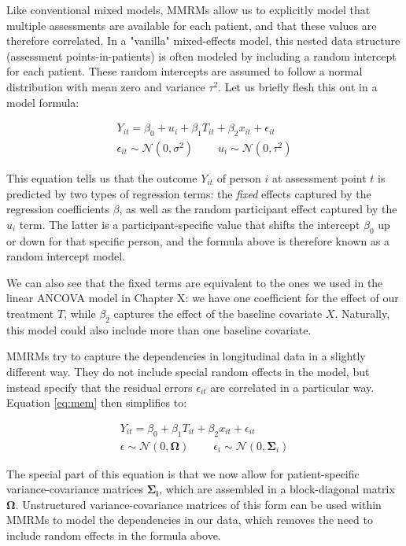 Like conventional mixed models, MMRMs allow us to explicitly model that multiple assessments are available for each patient, and that these values are therefore correlated. In a "vanilla" mixed-effects model, this nested data structure (assessment points-in-patients) is often modeled by including a random intercept for each patient. These random intercepts are assumed to follow a normal distribution with mean zero and variance $\tau^2$. Let us briefly flesh this out in a model formula:

\begin{align}
\label{eq:mem}
Y_{it} = \beta_0 + u_i + \beta_1T_{it} + \beta_2x_{it} + \epsilon_{it}  \\
\epsilon_{it} \sim \mathcal{N}(0, \sigma^2) ~~~~~~~~~~ u_i \sim \mathcal{N}(0, \tau^2)
\end{align}

This equation tells us that the outcome $Y_{it}$ of person $i$ at assessment point $t$ is predicted by two types of regression terms: the \emph{fixed} effects captured by the regression coefficients $\beta$, as well as the random participant effect captured by the $u_i$ term. The latter is a participant-specific value that shifts the intercept $\beta_0$ up or down for that specific person, and the formula above is therefore known as a random intercept model. 

We can also see that the fixed terms are equivalent to the ones we used in the linear ANCOVA model in Chapter X: we have one coefficient for the effect of our treatment $T$, while $\beta_2$ captures the effect of the baseline covariate $X$. Naturally, this model could also include more than one baseline covariate.

MMRMs try to capture the dependencies in longitudinal data in a slightly different way. They do not include special random effects in the model, but instead specify that the residual errors $\epsilon_{it}$ are correlated in a particular way. Equation \ref{eq:mem} then simplifies to: 

\begin{align}
Y_{it} = \beta_0 + \beta_1T_{it} + \beta_2x_{it} + \epsilon_{it} \\
\epsilon \sim \mathcal{N}(0, \boldsymbol{\Omega}) ~~~~~~~~~~ \epsilon_i \sim \mathcal{N}(0, \boldsymbol{\Sigma}_i)
\end{align}

The special part of this equation is that we now allow for patient-specific variance-covariance matrices $\boldsymbol{\Sigma_i}$, which are assembled in a block-diagonal matrix $\boldsymbol{\Omega}$. Unstructured variance-covariance matrices of this form can be used within MMRMs to model the dependencies in our data, which removes the need to include random effects in the formula above. 

